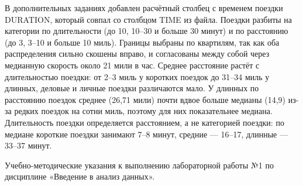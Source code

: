 \documentclass[a4paper,14pt]{extarticle}
\begin{document}
В дополнительных заданиях добавлен расчётный столбец с временем поездки DURATION, который совпал со столбцом TIME из файла. Поездки разбиты на категории по длительности (до 10, 10–30 и больше 30 минут) и по расстоянию (до 3, 3–10 и больше 10 миль). Границы выбраны по квартилям, так как оба распределения сильно скошены вправо, и согласованы между собой через медианную скорость около 21 мили в час. Среднее расстояние растёт с длительностью поездки: от 2–3 миль у коротких поездок до 31–34 миль у длинных, деловые и личные поездки различаются мало. У длинных по расстоянию поездок среднее (26,71 мили) почти вдвое больше медианы (14,9) из-за редких поездок на сотни миль, поэтому для них показательнее медиана. Длительность поездки определяется расстоянием, а не категорией поездки: по медиане короткие поездки занимают 7–8 минут, средние — 16–17, длинные — 33–37 минут.

\suaisources
Учебно-методические указания к выполнению лабораторной работы №1 по дисциплине «Введение в анализ данных».
\end{document}
